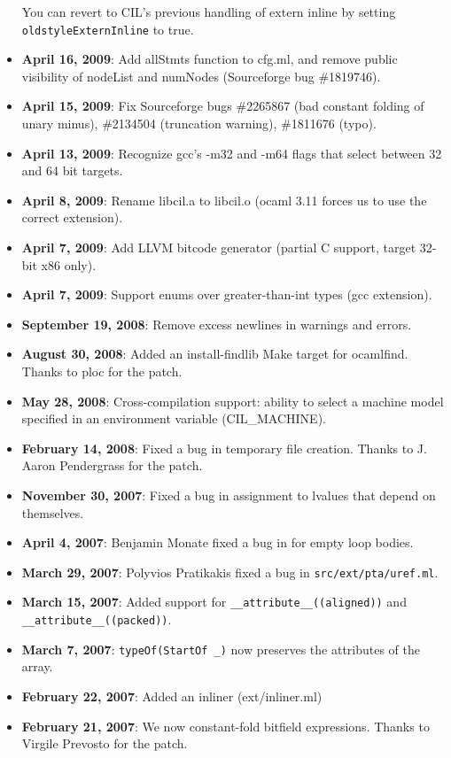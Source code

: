 \documentclass{article}
\def\moduleref#1{\ahref{api/#1.html}{#1}}
\def\t#1{{\tt #1}}
\begin{document}
\begin{itemize}
  You can revert to CIL's previous handling of extern inline by setting
  \t{oldstyleExternInline} to true.
\item {\bf April 16, 2009}: Add allStmts function to cfg.ml, and
  remove public visibility of nodeList and numNodes (Sourceforge bug
  \#1819746).
\item {\bf April 15, 2009}: Fix Sourceforge bugs \#2265867 (bad constant
  folding of unary minus), \#2134504 (truncation warning), \#1811676 (typo).
\item {\bf April 13, 2009}: Recognize gcc's -m32 and -m64 flags that select
  between 32 and 64 bit targets.
\item {\bf April 8, 2009}: Rename libcil.a to libcil.o (ocaml 3.11 forces
  us to use the correct extension).
\item {\bf April 7, 2009}: Add LLVM bitcode generator (partial C support, target
  32-bit x86 only).
\item {\bf April 7, 2009}: Support enums over greater-than-int types (gcc
  extension).
\item {\bf September 19, 2008}: Remove excess newlines in warnings and errors.
\item {\bf August 30, 2008}: Added an install-findlib Make target for
  ocamlfind.  Thanks to ploc for the patch.
\item {\bf May 28, 2008}: Cross-compilation support: ability to
  select a machine model specified in an environment variable (CIL\_MACHINE).
\item {\bf February 14, 2008}: Fixed a bug in temporary file
  creation.  Thanks to J. Aaron Pendergrass for the patch.
\item {\bf November 30, 2007}: Fixed a bug in assignment to lvalues that
      depend on themselves.
\item {\bf April 4, 2007}: Benjamin Monate fixed a bug in
  \moduleref{Cfg} for empty loop bodies.
\item {\bf March 29, 2007}: Polyvios Pratikakis fixed a bug in 
  \t{src/ext/pta/uref.ml}.
\item {\bf March 15, 2007}: Added support for
  \t{\_\_attribute\_\_((aligned))} and
  \t{\_\_attribute\_\_((packed))}.
\item {\bf March 7, 2007}: \t{typeOf(StartOf \_)} now preserves the
  attributes of the array.
\item {\bf February 22, 2007}: Added an inliner (ext/inliner.ml)
\item {\bf February 21, 2007}:  We now constant-fold bitfield
  expressions.  Thanks to Virgile Prevosto for the patch.

\end{itemize}
\end{document}
